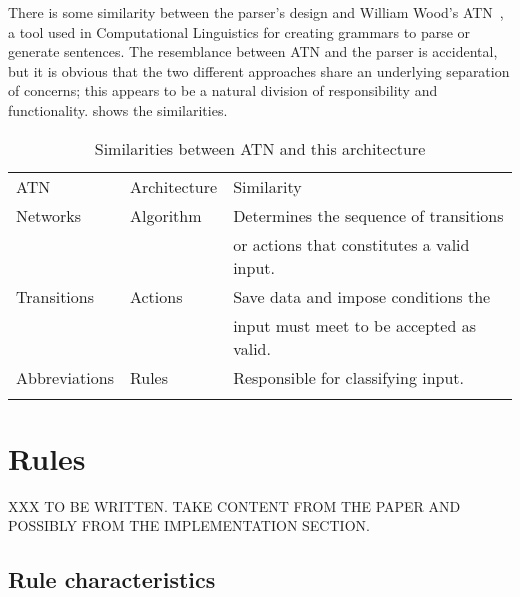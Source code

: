 There is some similarity between the parser's design and William Wood's
\gls{ATN}~\cite{atns,nlpip}, a tool used in Computational Linguistics for
creating grammars to parse or generate sentences.  The resemblance between
\gls{ATN} and the parser is accidental, but it is obvious that the two
different approaches share an underlying separation of concerns; this
appears to be a natural division of responsibility and functionality.
 shows the
similarities.


\begin{table}[ht]
    \caption{Similarities between ATN and this architecture}
    \empty{}\label{Similarities between ATN and this architecture}
    \begin{tabular}[]{lll}
        \tabletopline{}%
        \gls{ATN}          & Architecture  & Similarity                \\
        \tablemiddleline{}%
        Networks        & Algorithm     & Determines the sequence 
                                        of transitions              \\
                        &               & or actions that 
                                        constitutes a valid  input. \\
        Transitions     & Actions       & Save data and impose
                                        conditions the              \\
                        &               & input must meet to be
                                        accepted as valid.          \\
        Abbreviations   & Rules         & Responsible for 
                                        classifying input.          \\
        \tablebottomline{}%
    \end{tabular}
\end{table}

\section{Rules}

\label{rule in architecture}

XXX TO BE WRITTEN\@.  TAKE CONTENT FROM THE PAPER AND POSSIBLY FROM THE
IMPLEMENTATION SECTION\@.

\subsection{Rule characteristics}

